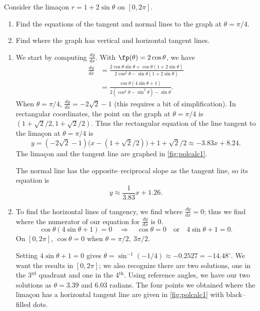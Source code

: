 {Consider the lima\c con $r=1+2\sin\theta$ on $[0,2\pi]$.
\begin{enumerate}
	\item	Find the equations of the tangent and normal lines to the graph at $\theta=\pi/4$.
	\item	Find where the graph has vertical and horizontal tangent lines.
\end{enumerate}
}
{\begin{enumerate}
	\item We start by computing $\frac{dy}{dx}$. With $\fp(\theta) = 2\cos\theta$, we have
	\begin{align*}
	\frac{dy}{dx} &= \frac{2\cos\theta\sin\theta + \cos\theta(1+2\sin\theta)}{2\cos^2\theta-\sin\theta(1+2\sin\theta)}\\
	&= \frac{\cos\theta(4\sin\theta+1)}{2(\cos^2\theta-\sin^2\theta)-\sin\theta}.
	\end{align*}
	When $\theta=\pi/4$, $\frac{dy}{dx}=-2\sqrt{2}-1$ (this requires a bit of simplification). In rectangular coordinates, the point on the graph at $\theta=\pi/4$ is $(1+\sqrt{2}/2,1+\sqrt{2}/2)$. Thus the rectangular equation of the line tangent to the lima\c con at $\theta=\pi/4$ is 
	$$y=(-2\sqrt{2}-1)\big(x-(1+\sqrt{2}/2)\big)+1+\sqrt{2}/2 \approx  -3.83 x+8.24.$$ The lima\c con and the tangent line are graphed in \autoref{fig:polcalc1}. 
	
	The normal line has the opposite--reciprocal slope as the tangent line, so its equation is 
	$$y \approx \frac{1}{3.83}x+1.26.$$
	
	\item		To find the horizontal lines of tangency, we find where $\frac{dy}{dx}=0$; thus we find where the numerator of our equation for $\frac{dy}{dx}$ is 0.
	$$\cos\theta(4\sin\theta+1)=0\quad \Rightarrow \quad \cos\theta=0 \quad \text{or}\quad 4\sin\theta+1=0.$$
	On $[0,2\pi]$, $\cos\theta=0$ when $\theta=\pi/2,\ 3\pi/2$. 

Setting $4\sin\theta+1=0$ gives $\theta=\sin^{-1}(-1/4)\approx -0.2527 = -14.48^\circ$. We want the results in $[0,2\pi]$; we also recognize there are two solutions, one in the 3$^\text{rd}$ quadrant and one in the 4$^\text{th}$. Using reference angles, we have our two solutions as $\theta =3.39$ and $6.03$ radians. The four points we obtained where the lima\c con has a horizontal tangent line are given in \autoref{fig:polcalc1} with black--filled dots.\bigskip


\end{enumerate}}
